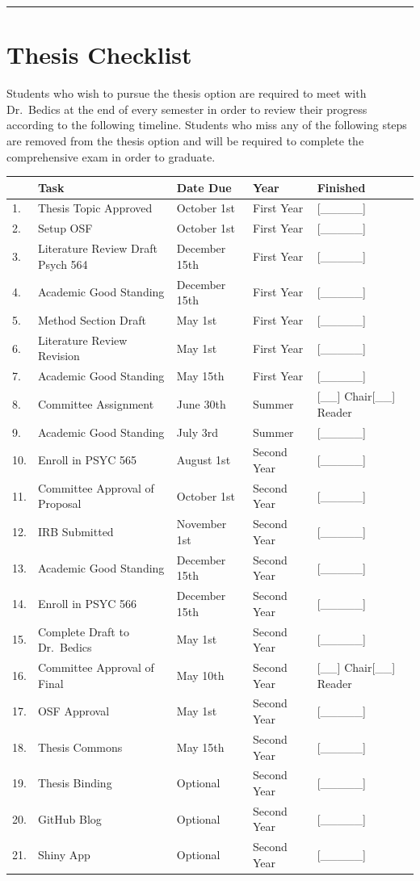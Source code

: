 \documentclass[openany]{book}
\begin{document}
\begin{center}\rule{0.5\linewidth}{0.5pt}\end{center}

\hypertarget{thesis-checklist}{%
\chapter{Thesis Checklist}\label{thesis-checklist}}

Students who wish to pursue the thesis option are required to meet with Dr.~Bedics at the end of every semester in order to review their progress according to the following timeline. Students who miss any of the following steps are removed from the thesis option and will be required to complete the comprehensive exam in order to graduate.

\begin{longtable}[]{@{}lllll@{}}
\toprule
& Task & Date Due & Year & Finished\tabularnewline
\midrule
\endhead
1. & Thesis Topic Approved & October 1st & First Year & {[}\_\_\_\_\_{]}\tabularnewline
2. & Setup OSF & October 1st & First Year & {[}\_\_\_\_\_{]}\tabularnewline
3. & Literature Review Draft Psych 564 & December 15th & First Year & {[}\_\_\_\_\_{]}\tabularnewline
4. & Academic Good Standing & December 15th & First Year & {[}\_\_\_\_\_{]}\tabularnewline
5. & Method Section Draft & May 1st & First Year & {[}\_\_\_\_\_{]}\tabularnewline
6. & Literature Review Revision & May 1st & First Year & {[}\_\_\_\_\_{]}\tabularnewline
7. & Academic Good Standing & May 15th & First Year & {[}\_\_\_\_\_{]}\tabularnewline
8. & Committee Assignment & June 30th & Summer & {[}\_\_{]} Chair{[}\_\_{]} Reader\tabularnewline
9. & Academic Good Standing & July 3rd & Summer & {[}\_\_\_\_\_{]}\tabularnewline
10. & Enroll in PSYC 565 & August 1st & Second Year & {[}\_\_\_\_\_{]}\tabularnewline
11. & Committee Approval of Proposal & October 1st & Second Year & {[}\_\_\_\_\_{]}\tabularnewline
12. & IRB Submitted & November 1st & Second Year & {[}\_\_\_\_\_{]}\tabularnewline
13. & Academic Good Standing & December 15th & Second Year & {[}\_\_\_\_\_{]}\tabularnewline
14. & Enroll in PSYC 566 & December 15th & Second Year & {[}\_\_\_\_\_{]}\tabularnewline
15. & Complete Draft to Dr.~Bedics & May 1st & Second Year & {[}\_\_\_\_\_{]}\tabularnewline
16. & Committee Approval of Final & May 10th & Second Year & {[}\_\_{]} Chair{[}\_\_{]} Reader\tabularnewline
17. & OSF Approval & May 1st & Second Year & {[}\_\_\_\_\_{]}\tabularnewline
18. & Thesis Commons & May 15th & Second Year & {[}\_\_\_\_\_{]}\tabularnewline
19. & Thesis Binding & Optional & Second Year & {[}\_\_\_\_\_{]}\tabularnewline
20. & GitHub Blog & Optional & Second Year & {[}\_\_\_\_\_{]}\tabularnewline
21. & Shiny App & Optional & Second Year & {[}\_\_\_\_\_{]}\tabularnewline
\bottomrule
\end{longtable}
\end{document}

